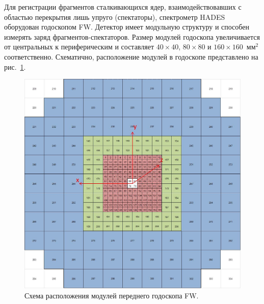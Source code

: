 Для регистрации фрагментов сталкивающихся ядер, взаимодействовавших с областью перекрытия лишь упруго (спектаторы), спектрометр HADES оборудован годоскопом FW.
Детектор имеет модульную структуру и способен измерять заряд фрагментов-спектаторов.
Размер модулей годоскопа увеличивается от центральных к периферическим и составляет $40\times40$, $80\times80$ и $160\times160$~мм$^2$ соответственно.
Схематично, расположение модулей в годоскопе представлено на рис.~\ref{fig:hodo_layout}.
%
\begin{figure}[ht]
\begin{center}
\includegraphics[width=0.75\linewidth]{images/FW_layout.jpg}
\caption{Схема расположения модулей переднего годоскопа FW.}
\label{fig:hodo_layout}
\end{center}
\end{figure}

